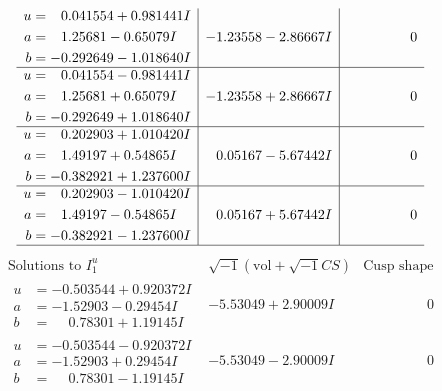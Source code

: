 \documentclass[1p]{elsarticle_modified}
\theoremstyle{definition}
\newcommand{\I}{\sqrt{-1}}
\begin{document}
$$\begin{array}{c|c|c}
\begin{aligned}
u &= \phantom{-}0.041554 + 0.981441 I \\
a &= \phantom{-}1.25681 - 0.65079 I \\
b &= -0.292649 - 1.018640 I\end{aligned}
 & -1.23558 - 2.86667 I & \phantom{-0.000000 } 0 \\ \hline\begin{aligned}
u &= \phantom{-}0.041554 - 0.981441 I \\
a &= \phantom{-}1.25681 + 0.65079 I \\
b &= -0.292649 + 1.018640 I\end{aligned}
 & -1.23558 + 2.86667 I & \phantom{-0.000000 } 0 \\ \hline\begin{aligned}
u &= \phantom{-}0.202903 + 1.010420 I \\
a &= \phantom{-}1.49197 + 0.54865 I \\
b &= -0.382921 + 1.237600 I\end{aligned}
 & \phantom{-}0.05167 - 5.67442 I & \phantom{-0.000000 } 0 \\ \hline\begin{aligned}
u &= \phantom{-}0.202903 - 1.010420 I \\
a &= \phantom{-}1.49197 - 0.54865 I \\
b &= -0.382921 - 1.237600 I\end{aligned}
 & \phantom{-}0.05167 + 5.67442 I & \phantom{-0.000000 } 0\\
 \hline 
 \end{array}$$\newpage$$\begin{array}{c|c|c}  
\text{Solutions to }I^u_{1}& \I (\text{vol} + \sqrt{-1}CS) & \text{Cusp shape}\\
 \hline 
\begin{aligned}
u &= -0.503544 + 0.920372 I \\
a &= -1.52903 - 0.29454 I \\
b &= \phantom{-}0.78301 + 1.19145 I\end{aligned}
 & -5.53049 + 2.90009 I & \phantom{-0.000000 } 0 \\ \hline\begin{aligned}
u &= -0.503544 - 0.920372 I \\
a &= -1.52903 + 0.29454 I \\
b &= \phantom{-}0.78301 - 1.19145 I\end{aligned}
 & -5.53049 - 2.90009 I & \phantom{-0.000000 } 0 \\ \hline\begin{aligned}

\end{aligned}
\end{array}$$
\end{document}
